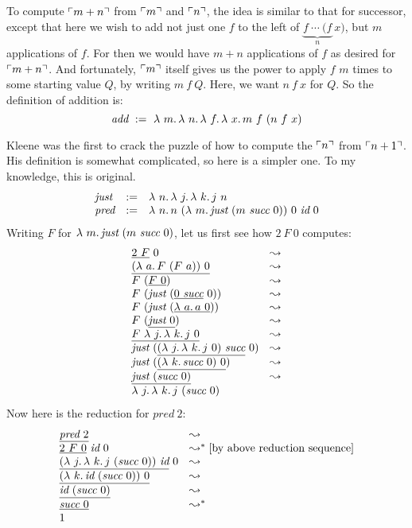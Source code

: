   To compute $\ulcorner m+n \urcorner$ from $\ulcorner m \urcorner$ and $\ulcorner n \urcorner$, the idea is similar to that for successor, except
that here we wish to add not just one $f$ to the left of $\underbrace{f \ \cdots\  (f }_{n}\ x)$, but $m$ applications of $f$.  For
then we would have $m+n$ applications of $f$ as desired for $\ulcorner m+n \urcorner$.  And fortunately, $\ulcorner m \urcorner$ itself gives us the power
to apply $f$ $m$ times to some starting value $Q$, by writing $m\ f\ Q$.  Here, we want $n\ f\ x$ for $Q$.  So the definition
of addition is:
\[
\textit{add} \ := \ \lam{m}{\lam{n}{\lam{f}{\lam{x}{m\ f\ (n\ f\ x)}}}}
\]

 Kleene was the first to crack the puzzle of how to compute the $\ulcorner n \urcorner$ from $\ulcorner n+1 \urcorner$.
His definition is somewhat complicated, so here is a simpler one.  To my knowledge, this is original.  
\[
\begin{array}{lll}
\textit{just} & := & \lam{n}{\lam{j}{\lam{k}{j\ n}}} \\
\textit{pred} & := & \lam{n}{n\ (\lam{m}{\textit{just}\ (m\ \textit{succ}\ 0)})\ 0\ \textit{id}\ 0}
\end{array}
\]
\noindent Writing $F$ for $\lam{m}{\textit{just}\ (m\ \textit{succ}\ 0)}$, let us first see how $2\ F\ 0$ computes:
\[
\begin{array}{ll}
  \underline{2\ F}\ 0 & \leadsto \\
  \underline{(\lam{a}{F\ (F\ a)})\ 0} & \leadsto \\
  F\ (\underline{F\ 0}) & \leadsto \\
  F\ (\textit{just}\ (\underline{0\ \textit{succ}}\ 0)) & \leadsto \\
  F\ (\textit{just}\ (\underline{\lam{a}{a}\ 0})) & \leadsto \\
  F\ (\underline{\textit{just}\ 0}) & \leadsto \\
  \underline{F\ \lam{j}{\lam{k}{j\ 0}}} & \leadsto \\    
  \textit{just}\ (\underline{(\lam{j}{\lam{k}{j\ 0}})\ \textit{succ}}\ 0) & \leadsto \\
  \textit{just}\ (\underline{(\lam{k}{\textit{succ}\ 0})\ 0}) & \leadsto \\
  \underline{\textit{just}\ (\textit{succ}\ 0)} & \leadsto \\
  \lam{j}{\lam{k}{j\ (\textit{succ}\ 0)}} & \ 
\end{array}
\]
\noindent Now here is the reduction for $\textit{pred}\ 2$:
\[
\begin{array}{ll}
  \underline{\textit{pred}\ 2} & \leadsto \\
  \underline{2\ F\ 0}\ \textit{id}\ 0 & \leadsto^* \textnormal{[by above reduction sequence]}\\
  \underline{(\lam{j}{\lam{k}{j\ (\textit{succ}\ 0)}})\ \textit{id}}\ 0 & \leadsto \\
  \underline{(\lam{k}{\textit{id}\ (\textit{succ}\ 0)})\ 0} & \leadsto \\
  \underline{\textit{id}\ (\textit{succ}\ 0)} & \leadsto \\
  \underline{\textit{succ}\ 0} & \leadsto^* \\
  1 &\ 
\end{array}
\]
  

